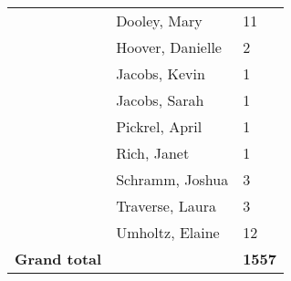\documentclass{article}\usepackage[]{graphicx}\usepackage[]{color}
\begin{document}
{\begin{longtable} { >{\raggedright}p{}|p{}p{}}
   & Dooley, Mary & 11 \\ 
   & Hoover, Danielle & 2 \\ 
   & Jacobs, Kevin & 1 \\ 
   \rowcolor[gray]{0.90} & Jacobs, Sarah & 1 \\ 
   \rowcolor[gray]{0.90} & Pickrel, April & 1 \\ 
   \rowcolor[gray]{0.90} & Rich, Janet & 1 \\ 
   & Schramm, Joshua & 3 \\ 
   & Traverse, Laura & 3 \\ 
   & Umholtz, Elaine & 12 \\ 
   \rowcolor[gray]{0.90}\textbf{Grand total} &  & \textbf{1557} \\ 
   \end{longtable}

}

\pagebreak
\end{document}
